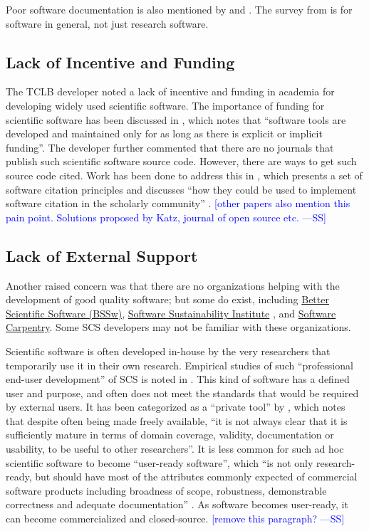 \documentclass[final, 3p, times, authoryear]{elsarticle}
\newcommand{\authornote}[3]{\textcolor{#1}{[#3 ---#2]}}
\newcommand{\authornote}[3]{}
\newcommand{\wss}[1]{\authornote{blue}{SS}{#1}} %
\begin{document}
Poor software documentation is also mentioned by \citet{PintoEtAl2018} and
\citet{LethbridgeEtAl2003}.  The survey from \citet{LethbridgeEtAl2003} is for
software in general, not just research software.

\subsection{Lack of Incentive and Funding}

The TCLB developer noted a lack of incentive and funding in academia for
developing widely used scientific software. The importance of funding for
scientific software has been discussed in \cite{gewaltig2012quality}, which
notes that ``software tools are developed and maintained only for as long as
there is explicit or implicit funding''. The developer further commented that
there are no journals that publish such scientific software source code.
However, there are ways to get such source code cited. Work has been done to
address this in \citep{smith2016software}, which presents a set of software
citation principles and discusses ``how they could be used to implement software
citation in the scholarly community'' \citep{katz2019software}.  \wss{other
papers also mention this pain point.  Solutions proposed by Katz, journal of
open source etc.}

\subsection{Lack of External Support}

Another raised concern was that there are no organizations helping with the
development of good quality software; but some do exist, including
\href{https://bssw.io/}{Better Scientific Software (BSSw)},
\href{https://www.software.ac.uk/}{Software Sustainability Institute}
\citep{CrouchEtAl2013}, and \href{https://software-carpentry.org/}{Software
Carpentry}. Some SCS developers may not be familiar with these organizations.
\citep{WilsonAndLumsdaine2006}

Scientific software is often developed in-house by the very researchers that
temporarily use it in their own research. Empirical studies of such
``professional end-user development'' of SCS is noted in \citep{segal2007end}.
This kind of software has a defined user and purpose, and often does not meet
the standards that would be required by external users. It has been categorized
as a ``private tool'' by \citep{gewaltig2012quality}, which notes that despite
often being made freely available, ``it is not always clear that it is
sufficiently mature in terms of domain coverage, validity, documentation or
usability, to be useful to other researchers''. It is less common for such ad
hoc scientific software to become ``user-ready software'', which ``is not only
research-ready, but should have most of the attributes commonly expected of
commercial software products including broadness of scope, robustness,
demonstrable correctness and adequate documentation''
\citep{gewaltig2012quality}. As software becomes user-ready, it can become
commercialized and closed-source.  \wss{remove this paragraph?}
\end{document}
